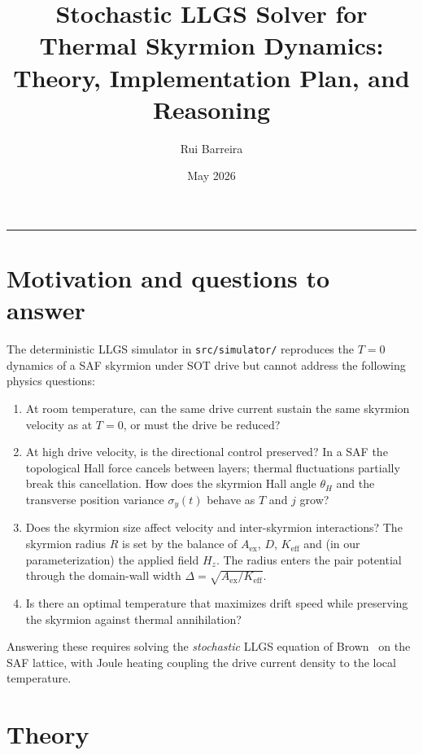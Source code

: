 \documentclass[11pt,a4paper]{article}
\title{Stochastic LLGS Solver for Thermal Skyrmion Dynamics:\\
Theory, Implementation Plan, and Reasoning}
\author{Rui Barreira}
\date{May 2026}
\newcommand{\Aex}{A_{\text{ex}}}
\newcommand{\Keff}{K_{\text{eff}}}
\newcommand{\jcur}{j}
\begin{document}
\maketitle

\tableofcontents
\bigskip\hrule\bigskip

\section{Motivation and questions to answer}

The deterministic LLGS simulator in \texttt{src/simulator/} reproduces
the $T = 0$ dynamics of a SAF skyrmion under SOT drive but cannot
address the following physics questions:

\begin{enumerate}[leftmargin=2em]
    \item[\textbf{Q1}] At room temperature, can the same drive current
    sustain the same skyrmion velocity as at $T = 0$, or must the
    drive be reduced?
    \item[\textbf{Q2}] At high drive velocity, is the directional
    control preserved? In a SAF the topological Hall force cancels
    between layers; thermal fluctuations partially break this
    cancellation. How does the skyrmion Hall angle $\theta_H$ and the
    transverse position variance $\sigma_y(t)$ behave as $T$ and
    $\jcur$ grow?
    \item[\textbf{Q3}] Does the skyrmion size affect velocity and
    inter-skyrmion interactions? The skyrmion radius $R$ is set by
    the balance of $\Aex$, $D$, $\Keff$ and (in our parameterization)
    the applied field $H_z$. The radius enters the pair potential
    through the domain-wall width $\Delta = \sqrt{\Aex/\Keff}$.
    \item[\textbf{Q4}] Is there an optimal temperature that maximizes
    drift speed while preserving the skyrmion against thermal
    annihilation?
\end{enumerate}

Answering these requires solving the \emph{stochastic} LLGS equation
of Brown~\cite{brown1963} on the SAF lattice, with Joule heating
coupling the drive current density to the local temperature.

\section{Theory}
\end{document}
